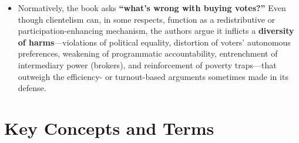 \documentclass[12pt]{article}
\begin{document}
\begin{itemize}[leftmargin=*, itemsep=4pt]
    \item Normatively, the book asks \textbf{``what's wrong with buying votes?''} Even though clientelism can, in some respects, function as a redistributive or participation-enhancing mechanism, the authors argue it inflicts a \textbf{diversity of harms}---violations of political equality, distortion of voters' autonomous preferences, weakening of programmatic accountability, entrenchment of intermediary power (brokers), and reinforcement of poverty traps---that outweigh the efficiency- or turnout-based arguments sometimes made in its defense.
\end{itemize}

\section{Key Concepts and Terms}
\end{document}
